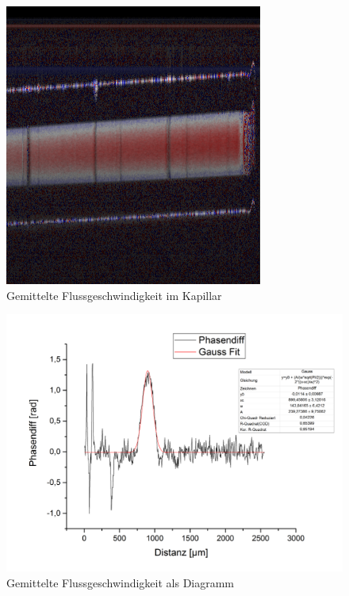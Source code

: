 \documentclass[german, %
parskip=full, %
bibliography=totoc, %
]{scrartcl}
\begin{document}
\begin{figure}[ht]
	\centering
	  \includegraphics[width=\textwidth]{DopplerFluss}
	\caption{Gemittelte Flussgeschwindigkeit im Kapillar}
	\label{fig:flussbild}
\end{figure}
\begin{figure}[ht]
  \centering
	  \includegraphics[width=\textwidth]{FlussDiagramm}
	\caption{Gemittelte Flussgeschwindigkeit als Diagramm}
	\label{fig:flussdia}
\end{figure}
\end{document}
